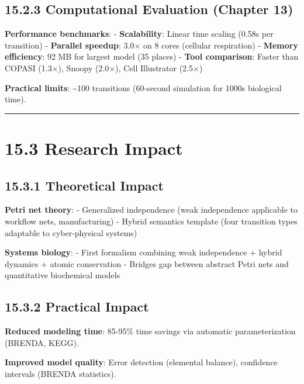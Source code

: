 \hypertarget{computational-evaluation-chapter-13}{%
\subsection{15.2.3 Computational Evaluation (Chapter
13)}\label{computational-evaluation-chapter-13}}

\textbf{Performance benchmarks}: - \textbf{Scalability}: Linear time
scaling (0.58s per transition) - \textbf{Parallel speedup}: 3.0× on 8
cores (cellular respiration) - \textbf{Memory efficiency}: 92 MB for
largest model (35 places) - \textbf{Tool comparison}: Faster than COPASI
(1.3×), Snoopy (2.0×), Cell Illustrator (2.5×)

\textbf{Practical limits}: \textasciitilde100 transitions (60-second
simulation for 1000s biological time).

\begin{center}\rule{0.5\linewidth}{0.5pt}\end{center}

\hypertarget{research-impact}{%
\section{15.3 Research Impact}\label{research-impact}}

\hypertarget{theoretical-impact}{%
\subsection{15.3.1 Theoretical Impact}\label{theoretical-impact}}

\textbf{Petri net theory}: - Generalized independence (weak independence
applicable to workflow nets, manufacturing) - Hybrid semantics template
(four transition types adaptable to cyber-physical systems)

\textbf{Systems biology}: - First formalism combining weak independence
+ hybrid dynamics + atomic conservation - Bridges gap between abstract
Petri nets and quantitative biochemical models

\hypertarget{practical-impact}{%
\subsection{15.3.2 Practical Impact}\label{practical-impact}}

\textbf{Reduced modeling time}: 85-95\% time savings via automatic
parameterization (BRENDA, KEGG).

\textbf{Improved model quality}: Error detection (elemental balance),
confidence intervals (BRENDA statistics).

